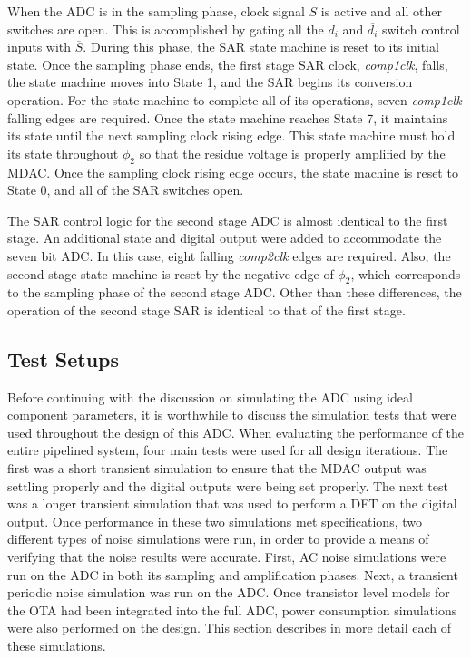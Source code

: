 When the ADC is in the sampling phase, clock signal $S$ is active and all other switches are open. This is accomplished by gating all the $d_{i}$ and $\overline{d_{i}}$ switch control inputs with $\overline{S}$. During this phase, the SAR state machine is reset to its initial state.  Once the sampling phase ends, the first stage SAR clock, \emph{comp1clk}, falls, the state machine moves into State 1, and the SAR begins its conversion operation. For the state machine to complete all of its operations, seven \emph{comp1clk} falling edges are required. Once the state machine reaches State 7, it maintains its state until the next sampling clock rising edge. This state machine must hold its state throughout $\phi_{2}$ so that the residue voltage is properly amplified by the MDAC. Once the sampling clock rising edge occurs, the state machine is reset to State 0, and all of the SAR switches open. 

The SAR control logic for the second stage ADC is almost identical to the first stage. An additional state and digital output were added to accommodate the seven bit ADC. In this case, eight falling \emph{comp2clk} edges are required. Also, the second stage state machine is reset by the negative edge of $\phi_{2}$, which corresponds to the sampling phase of the second stage ADC. Other than these differences, the operation of the second stage SAR is identical to that of the first stage.
\subsection{Test Setups}
\label{sec:adcsimulations}
Before continuing with the discussion on simulating the ADC using ideal component parameters, it is worthwhile to discuss the simulation tests that were used throughout the design of this ADC. When evaluating the performance of the entire pipelined system, four main tests were used for all design iterations. The first was a short transient simulation to ensure that the MDAC output was settling properly and the digital outputs were being set properly. The next test was a longer transient simulation that was used to perform a DFT on the digital output. Once performance in these two simulations met specifications, two different types of noise simulations were run, in order to provide a means of verifying that the noise results were accurate. First, AC noise simulations were run on the ADC in both its sampling and amplification phases. Next, a transient periodic noise simulation was run on the ADC. Once transistor level models for the OTA had been integrated into the full ADC, power consumption simulations were also performed on the design. This section describes in more detail each of these simulations.
